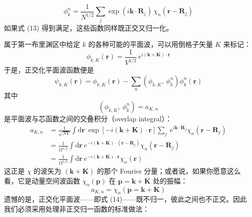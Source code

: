 \begin{equation*}
\phi_k^n=\frac{1}{N^{1/2}}\sum_j \exp(i\mathbf{k}\cdot\mathbf{R}_j)\,\chi_n(\mathbf{r}-\mathbf{R}_j)
\end{equation*}
如果式 (13) 得到满足，这些函数同样既正交又归一化。

属于第一布里渊区中给定 $k$ 的各种可能的平面波，可以用倒格子矢量 $K$ 来标记：
\begin{equation*}
\phi_{k,K}(\mathbf{r})=\frac{1}{V^{1/2}}\,e^{i(\mathbf{k}+\mathbf{K})\cdot\mathbf{r}}
\end{equation*}
于是，正交化平面波函数便是
\begin{equation*}
\psi_{k,K}(\mathbf{r})=\phi_{k,K}(\mathbf{r})-\sum_n\left(\phi_{k,K},\ \phi_k^n\right)\phi_k^n(\mathbf{r})\tag{14}
\end{equation*}
其中
\begin{equation*}
\left(\phi_{k,K},\ \phi_k^n\right)=a_{K,n}\tag{15}
\end{equation*}
是平面波与芯函数之间的交叠积分（overlap integral）：
\begin{align*}
a_{K,n}&=\frac{1}{\sqrt{NV}}\int \mathrm{d}\mathbf{r}\ \exp\left[-i(\mathbf{k}+\mathbf{K})\cdot\mathbf{r}\right]\sum_j\ e^{i\mathbf{k}\cdot\mathbf{R}_j}\chi_n(\mathbf{r}-\mathbf{R}_j)\\
&=\frac{1}{\Omega^{1/2}}\int \mathrm{d}\mathbf{r}\ e^{-i(\mathbf{k}+\mathbf{K})\cdot(\mathbf{r}-\mathbf{R}_j)}\chi_n(\mathbf{r}-\mathbf{R}_j)\\
&=\frac{1}{\Omega^{1/2}}\int \mathrm{d}\mathbf{r}\ e^{-i(\mathbf{k}+\mathbf{K})\cdot\mathbf{r}}\chi_n(\mathbf{r})
\end{align*}
这正是 $\chi$ 的波矢为 $(\mathbf{k}+\mathbf{K})$ 的那个 Fourier 分量；或者说，如果你愿意这么看，它是动量空间波函数 $\chi_n(\mathbf{p})$ 在 $\mathbf{p}=\mathbf{k}+\mathbf{K}$ 处的振幅：
\begin{equation*}
a_{K,n}=\chi_n(\mathbf{p}=\mathbf{k}+\mathbf{K})
\end{equation*}
遗憾的是，正交化平面波——即式 (14)——既不归一，彼此之间也不正交。因此我们必须采用处理非正交归一函数的标准做法：

